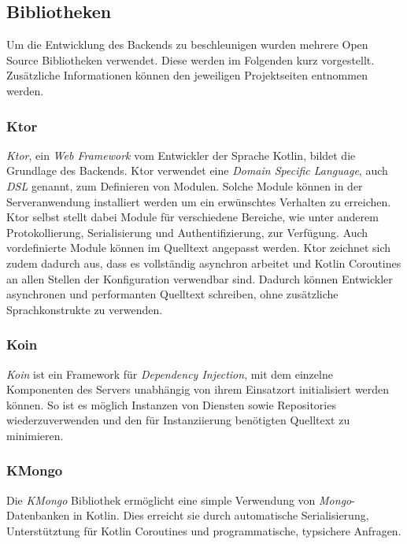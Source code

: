 \documentclass[a4paper, 11pt]{article}
\begin{document}
\subsection{Bibliotheken}
\label{subsec:backend:bibs}
Um die Entwicklung des Backends zu beschleunigen wurden mehrere Open Source Bibliotheken verwendet.
Diese werden im Folgenden kurz vorgestellt.
Zusätzliche Informationen können den jeweiligen Projektseiten entnommen werden.

\subsubsection{Ktor}
\label{subsubsec:backend:bibs:ktor}
\textit{Ktor}, ein \textit{Web Framework} vom Entwickler der Sprache Kotlin, bildet die Grundlage des Backends.
Ktor verwendet eine \textit{Domain Specific Language}, auch \textit{DSL} genannt, zum Definieren von Modulen.
Solche Module können in der Serveranwendung installiert werden um ein erwünschtes Verhalten zu erreichen.
Ktor selbst stellt dabei Module für verschiedene Bereiche, wie unter anderem Protokollierung, Serialisierung und Authentifizierung, zur Verfügung.
Auch vordefinierte Module können im Quelltext angepasst werden.
Ktor zeichnet sich zudem dadurch aus, dass es vollständig asynchron arbeitet und Kotlin Coroutines an allen Stellen der Konfiguration verwendbar sind.
Dadurch können Entwickler asynchronen und performanten Quelltext schreiben, ohne zusätzliche Sprachkonstrukte zu verwenden.

\subsubsection{Koin}
\label{subsubsec:backend:bibs:koin}
\textit{Koin} ist ein Framework für \textit{Dependency Injection}, mit dem einzelne Komponenten des Servers unabhängig von ihrem Einsatzort initialisiert werden können.
So ist es möglich Instanzen von Diensten sowie Repositories wiederzuverwenden und den für Instanziierung benötigten Quelltext zu minimieren.

\subsubsection{KMongo}
\label{subsubsec:backend:bibs:kmongo}
Die \textit{KMongo} Bibliothek ermöglicht eine simple Verwendung von \textit{Mongo}-Datenbanken in Kotlin.
Dies erreicht sie durch automatische Serialisierung, Unterstütztung für Kotlin Coroutines und programmatische, typsichere Anfragen.
\end{document}
